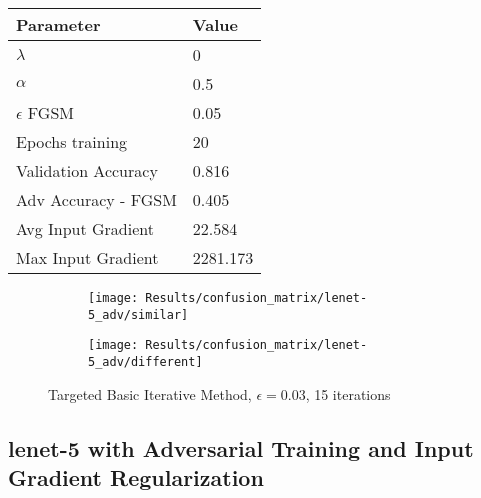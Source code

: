 \documentclass[draft,final]{vutinfth} %
\begin{document}
\begin{table}[h]
  \centering
  \begin{tabular}{ll}
    \toprule
			Parameter			& Value   \\
    \midrule
			$\lambda$								& 0				\\
			$\alpha$								& 0.5			\\
			$\epsilon$ FGSM					& 0.05		\\
			Epochs training					& 20			\\
			
			Validation Accuracy			& 0.816		\\ 
			Adv Accuracy - FGSM			& 0.405		\\
			
			Avg Input Gradient			& 22.584	\\
			Max Input Gradient			& 2281.173\\
    \bottomrule
  \end{tabular}
\end{table}


\begin{figure}[h]
  \begin{subfigure}[b]{0.5\columnwidth}
		\centering
    \texttt{[image: Results/confusion\_matrix/lenet-5\_adv/similar]}
    \label{fig:exp:cm:lenet-5_adv:similar}
  \end{subfigure}
  \begin{subfigure}[b]{0.5\columnwidth}
		\centering
    \texttt{[image: Results/confusion\_matrix/lenet-5\_adv/different]}
    \label{fig:exp:cm:lenet-5_adv:different}
  \end{subfigure}
  \caption{Targeted Basic Iterative Method, $\epsilon = 0.03$, 15 iterations}
  \label{fig:exp:cm:lenet-5_adv}
\end{figure}
\clearpage

\subsection{lenet-5 with Adversarial Training and Input Gradient Regularization}
\end{document}
